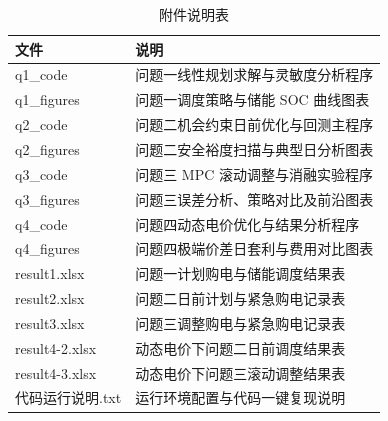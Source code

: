 \documentclass{cumcmthesis}
\begin{document}
\begin{table}[htbp]
\centering
\renewcommand\arraystretch{1.25}
\setlength{\tabcolsep}{10pt}
\caption{附件说明表}
\label{tab:appendix_support}
\begin{tabularx}{\textwidth}{p{4.5cm}X}
\toprule
\textbf{文件} & \textbf{说明}\\
\midrule
q1\_code & 问题一线性规划求解与灵敏度分析程序\\
q1\_figures & 问题一调度策略与储能 SOC 曲线图表\\
q2\_code & 问题二机会约束日前优化与回测主程序\\
q2\_figures & 问题二安全裕度扫描与典型日分析图表\\
q3\_code & 问题三 MPC 滚动调整与消融实验程序\\
q3\_figures & 问题三误差分析、策略对比及前沿图表\\
q4\_code & 问题四动态电价优化与结果分析程序\\
q4\_figures & 问题四极端价差日套利与费用对比图表\\
result1.xlsx & 问题一计划购电与储能调度结果表\\
result2.xlsx & 问题二日前计划与紧急购电记录表\\
result3.xlsx & 问题三调整购电与紧急购电记录表\\
result4-2.xlsx & 动态电价下问题二日前调度结果表\\
result4-3.xlsx & 动态电价下问题三滚动调整结果表\\
代码运行说明.txt & 运行环境配置与代码一键复现说明\\
\bottomrule
\end{tabularx}
\end{table}
\end{document}

